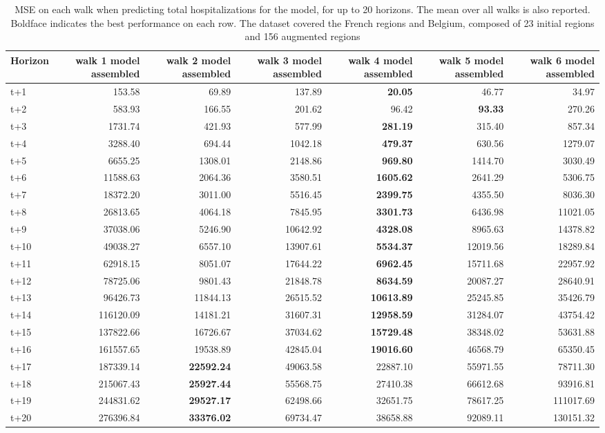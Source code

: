 \begin{table}[H]
\centering
\caption{MSE on each walk when predicting total hospitalizations for the model, for up to 20 horizons. The mean over all walks is also reported. Boldface indicates the best performance on each row. The dataset covered the French regions and Belgium, composed of 23 initial regions and 156 augmented regions }
\label{tab:MSE_walk_assembly}
\begin{tabular}{lrrrrrr}
\toprule
Horizon &  walk 1 model assembled &  walk 2 model assembled &  walk 3 model assembled &  walk 4 model assembled &  walk 5 model assembled &  walk 6 model assembled \\
\midrule
t+1  & 153.58  & 69.89  & 137.89  & \textbf{20.05}  & 46.77  & 34.97  \\
t+2  & 583.93  & 166.55  & 201.62  & 96.42  & \textbf{93.33}  & 270.26  \\
t+3  & 1731.74  & 421.93  & 577.99  & \textbf{281.19}  & 315.40  & 857.34  \\
t+4  & 3288.40  & 694.44  & 1042.18  & \textbf{479.37}  & 630.56  & 1279.07  \\
t+5  & 6655.25  & 1308.01  & 2148.86  & \textbf{969.80}  & 1414.70  & 3030.49  \\
t+6  & 11588.63  & 2064.36  & 3580.51  & \textbf{1605.62}  & 2641.29  & 5306.75  \\
t+7  & 18372.20  & 3011.00  & 5516.45  & \textbf{2399.75}  & 4355.50  & 8036.30  \\
t+8  & 26813.65  & 4064.18  & 7845.95  & \textbf{3301.73}  & 6436.98  & 11021.05  \\
t+9  & 37038.06  & 5246.90  & 10642.92  & \textbf{4328.08}  & 8965.63  & 14378.82  \\
t+10  & 49038.27  & 6557.10  & 13907.61  & \textbf{5534.37}  & 12019.56  & 18289.84  \\
t+11  & 62918.15  & 8051.07  & 17644.22  & \textbf{6962.45}  & 15711.68  & 22957.92  \\
t+12  & 78725.06  & 9801.43  & 21848.78  & \textbf{8634.59}  & 20087.27  & 28640.91  \\
t+13  & 96426.73  & 11844.13  & 26515.52  & \textbf{10613.89}  & 25245.85  & 35426.79  \\
t+14  & 116120.09  & 14181.21  & 31607.31  & \textbf{12958.59}  & 31284.07  & 43754.42  \\
t+15  & 137822.66  & 16726.67  & 37034.62  & \textbf{15729.48}  & 38348.02  & 53631.88  \\
t+16  & 161557.65  & 19538.89  & 42845.04  & \textbf{19016.60}  & 46568.79  & 65350.45  \\
t+17  & 187339.14  & \textbf{22592.24}  & 49063.58  & 22887.10  & 55971.55  & 78711.30  \\
t+18  & 215067.43  & \textbf{25927.44}  & 55568.75  & 27410.38  & 66612.68  & 93916.81  \\
t+19  & 244831.62  & \textbf{29527.17}  & 62498.66  & 32651.75  & 78617.25  & 111017.69  \\
t+20  & 276396.84  & \textbf{33376.02}  & 69734.47  & 38658.88  & 92089.11  & 130151.32  \\

\bottomrule
\end{tabular}
\end{table}
